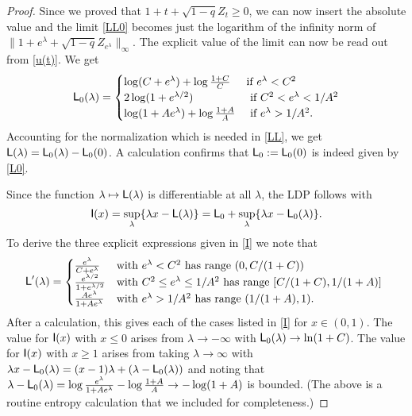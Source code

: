 \documentclass{amsart}
\theoremstyle{definition}
\theoremstyle{remark}
\theoremstyle{remark}
\theoremstyle{definition}
\numberwithin{equation}{section}
\begin{document}
\begin{proof}
 Since we proved that $1+t+\sqrt{1-q}Z_t\geq 0$, we can now insert the absolute value and the limit \eqref{LL0}
becomes just the logarithm of the infinity norm of $\|1+e^\lambda+\sqrt{1-q}Z_{e^\lambda}\|_\infty$. The explicit value of the
limit can now be read out from \eqref{u(t)}. We get
\begin{equation}\label{L0-ans}
  {\mbox{\fontfamily{phv}\selectfont L}}_0(\lambda)=\begin{cases}
\log (C+e^{\lambda})+\log\frac{1+C}{C}  & \mbox{if  $e^{\lambda}<C^2$} \\
2 \log(1+e^{{\lambda}/2})   &\mbox{ if $C^2<e^{\lambda}<1/A^2$} \\
\log(1+A e^{\lambda})+\log \frac{1+A}{A} & \mbox{ if $e^{\lambda}>1/A^2$}.
  \end{cases}
\end{equation}
Accounting for  the normalization which is needed in \eqref{LL}, we get ${\mbox{\fontfamily{phv}\selectfont L}}({\lambda})={\mbox{\fontfamily{phv}\selectfont L}}_0({\lambda})-{\mbox{\fontfamily{phv}\selectfont L}}_0(0)$. A calculation confirms
that ${\mbox{\fontfamily{phv}\selectfont L}}_0:={\mbox{\fontfamily{phv}\selectfont L}}_0(0)$ is indeed given by \eqref{L0}.

Since the function ${\lambda}\mapsto {\mbox{\fontfamily{phv}\selectfont L}}({\lambda})$ is  differentiable at all ${\lambda}$, the LDP follows with
$$
{\mbox{\fontfamily{phv}\selectfont I}}(x)=\sup_{\lambda}\{{\lambda} x-{\mbox{\fontfamily{phv}\selectfont L}}({\lambda})\}={\mbox{\fontfamily{phv}\selectfont L}}_0+\sup_{\lambda}\{{\lambda} x-{\mbox{\fontfamily{phv}\selectfont L}}_0({\lambda})\}.
$$
To derive the three explicit expressions given in \eqref{I}
we note that
$${\mbox{\fontfamily{phv}\selectfont L}}'({\lambda})=\begin{cases}
  \frac{e^{\lambda}}{C+e^{\lambda}} & \mbox{with $e^{\lambda}<C^2$ has range $(0,C/(1+C))$ }\\
  \frac{e^{{\lambda}/2}}{1+e^{{\lambda}/2}} & \mbox{with $C^2\leq e^{\lambda}\leq 1/A^2$ has range $[C/(1+C), 1/(1+A)]$ }\\
  \frac{Ae^{\lambda}}{1+Ae^{\lambda}} & \mbox{with $e^{\lambda}>1/A^2$ has range $(1/(1+A), 1)$}.
\end{cases}$$
After a calculation, this gives each of the cases listed in \eqref{I} for $x\in(0,1)$.
The value for ${\mbox{\fontfamily{phv}\selectfont I}}(x)$ with $x\leq 0 $  arises from ${\lambda}\to-\infty$ with ${\mbox{\fontfamily{phv}\selectfont L}}_0({\lambda})\to \ln(1+C)$.
The value for ${\mbox{\fontfamily{phv}\selectfont I}}(x)$ with  $x\geq 1$
arises from taking  ${\lambda}\to\infty$ with ${\lambda} x -{\mbox{\fontfamily{phv}\selectfont L}}_0({\lambda})= (x-1){\lambda}  +({\lambda} -{\mbox{\fontfamily{phv}\selectfont L}}_0({\lambda})) $ and noting that
 ${\lambda} -{\mbox{\fontfamily{phv}\selectfont L}}_0({\lambda})=\log\frac{e^{\lambda}}{1+A e^{\lambda}}-\log\frac{1+A}{A}\to -\log(1+A)$ is bounded.
(The above is a routine entropy calculation that we included for completeness.)

\end{proof}
\end{document}
